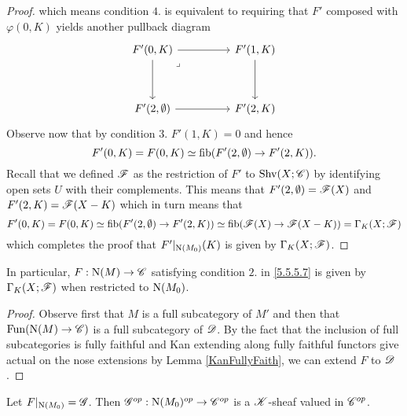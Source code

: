 \documentclass[../../thesis.tex]{subfiles}
\begin{document}
\begin{proof}
    which means condition $4.$ is equivalent to requiring that $F'$ composed with $\varphi(0,K)$ yields another pullback diagram
    \[\begin{tikzcd}
            {F'(0,K)} && {F'(1,K)} \\
            \\
            {F'(2,\emptyset)} && {F'(2,K)}
            \arrow[from=1-1, to=1-3]
            \arrow[from=1-3, to=3-3]
            \arrow[from=3-1, to=3-3]
            \arrow[from=1-1, to=3-1]
            \arrow["\lrcorner"{anchor=center, pos=0.125}, draw=none, from=1-1, to=3-3]
        \end{tikzcd}\]
    Observe now that by condition $3.$ $F'(1,K)=0$ and hence
    \[
        F'(0,K)=F(0,K)\simeq \operatorname{fib}(F'(2,\emptyset) \to F'(2,K)).
    \]
    Recall that we defined $\mathscr{F}$ as the restriction of $F'$ to $\mathrm{Shv}(X;\mathscr{C})$ by identifying open sets $U$ with their complements.
    This means that $F'(2,\emptyset) = \mathscr{F}(X)$ and $F'(2,K) = \mathscr{F}(X-K)$ which in turn means that
    \[
        F'(0,K)=F(0,K)\simeq \operatorname{fib}(F'(2,\emptyset) \to F'(2,K)) \simeq \operatorname{fib}(\mathscr{F}(X) \to \mathscr{F}(X-K)) = \Gamma_K(X;\mathscr{F})
    \]
    which completes the proof that $F'|_{\mathrm{N}(M_0)}(K)$ is given by $\Gamma_K(X;\mathscr{F})$.
\end{proof}
\begin{corollary}
    In particular, $F:\mathrm{N}(M) \to \mathscr{C}$ satisfying condition $2.$ in \ref{5.5.5.7} is given by $\Gamma_K(X;\mathscr{F})$ when restricted to $\mathrm{N}(M_0)$.
\end{corollary}
\begin{proof}
    Observe first that $M$ is a full subcategory of $M'$ and then that $\mathrm{Fun}(\mathrm{N}(M) \to \mathscr{C})$ is a full subcategory of $\mathscr{D}$.
    By the fact that the inclusion of full subcategories is fully faithful and Kan extending along fully faithful functors give actual on the nose extensions by Lemma \ref{KanFullyFaith}, we can extend $F$ to $\mathscr{D}$.
\end{proof}
\begin{lemma}
    Let $F|_{\mathrm{N}(M_0)} = \mathscr{G}$.
    Then $\mathscr{G}^{op}: \mathrm{N}(M_0)^{op} \to \mathscr{C}^{op}$ is a $\mathscr{K}$-sheaf valued in $\mathscr{C}^{op}$.
\end{lemma}
\end{document}
